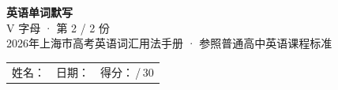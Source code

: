 \documentclass[10pt,a4paper]{article}
\begin{document}
\pagestyle{plain}

\begin{center}
{\LARGE\bfseries 英语单词默写}\\[0.22em]
{\large V 字母 · 第 2 / 2 份}\\[0.18em]
{\small 2026年上海市高考英语词汇用法手册 · 参照普通高中英语课程标准}
\end{center}

\vspace{0.25em}
\noindent\begin{tabular}{@{}p{}@{}p{}@{}p{}@{}}
姓名：\underline{\hspace{2.0cm}} & 日期：\underline{\hspace{2.0cm}} & 得分：\underline{\hspace{1.3cm}}\,/\,30 \\
\end{tabular}

\vspace{0.3em}

\vspace{0.08em}
\end{document}
